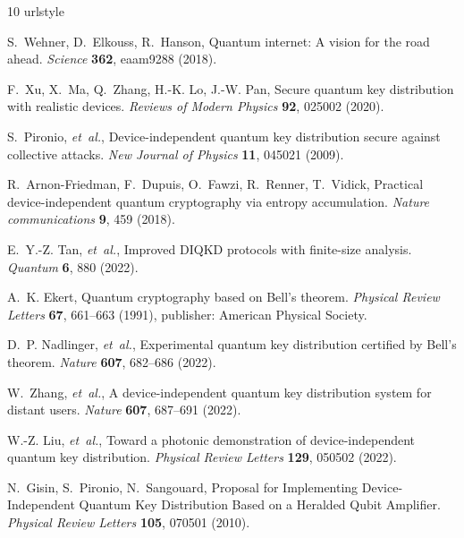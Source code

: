 \documentclass[aps,reprint,showpacs,superscriptaddress]{revtex4-2}
\begin{document}
\begin{thebibliography}{10}
\providecommand{\url}[1]{\texttt{#1}}
\expandafter\ifx\csname urlstyle\endcsname\relax
  \providecommand{\doi}[1]{doi:\discretionary{}{}{}#1}\else
  \providecommand{\doi}{doi:\discretionary{}{}{}\begingroup
  \urlstyle{rm}\Url}\fi

S.~Wehner, D.~Elkouss, R.~Hanson, Quantum internet: A vision for the road
  ahead. \emph{Science} \textbf{362}, eaam9288 (2018).

F.~Xu, X.~Ma, Q.~Zhang, H.-K. Lo, J.-W. Pan, Secure quantum key distribution
  with realistic devices. \emph{Reviews of Modern Physics} \textbf{92}, 025002
  (2020).

S.~Pironio, \emph{et~al.}, Device-independent quantum key distribution secure
  against collective attacks. \emph{New Journal of Physics} \textbf{11}, 045021
  (2009).

R.~Arnon-Friedman, F.~Dupuis, O.~Fawzi, R.~Renner, T.~Vidick, Practical
  device-independent quantum cryptography via entropy accumulation.
  \emph{Nature communications} \textbf{9}, 459 (2018).

E.~Y.-Z. Tan, \emph{et~al.}, {Improved {DIQKD} protocols with finite-size
  analysis}. \emph{{Quantum}} \textbf{6}, 880 (2022).

A.~K. Ekert, Quantum cryptography based on {Bell}'s theorem. \emph{Physical
  Review Letters} \textbf{67}, 661--663 (1991), publisher: American Physical
  Society.

D.~P. Nadlinger, \emph{et~al.}, Experimental quantum key distribution certified
  by Bell's theorem. \emph{Nature} \textbf{607}, 682--686 (2022).

W.~Zhang, \emph{et~al.}, A device-independent quantum key distribution system
  for distant users. \emph{Nature} \textbf{607}, 687--691 (2022).

W.-Z. Liu, \emph{et~al.}, Toward a photonic demonstration of device-independent
  quantum key distribution. \emph{Physical Review Letters} \textbf{129}, 050502
  (2022).

N.~Gisin, S.~Pironio, N.~Sangouard, Proposal for Implementing
  Device-Independent Quantum Key Distribution Based on a Heralded Qubit
  Amplifier. \emph{Physical Review Letters} \textbf{105}, 070501 (2010).


\end{thebibliography}
\end{document}
